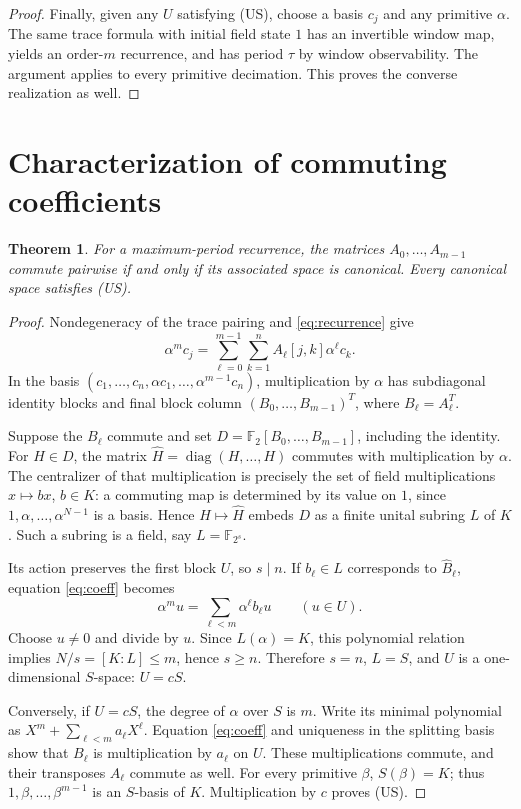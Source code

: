 \documentclass[11pt,a4paper]{article}
\newtheorem{theorem}{Theorem}[section]
\theoremstyle{definition}\newtheorem{definition}[theorem]{Definition}
\theoremstyle{remark}\newtheorem{remark}[theorem]{Remark}
\newcommand{\F}{\mathbb F}
\newcommand{\US}{\textup{(US)}}
\numberwithin{equation}{section}
\begin{document}
\begin{proof}
Finally, given any $U$ satisfying \US, choose a basis $c_j$ and any primitive $\alpha$. The same trace formula with initial field state $1$ has an invertible window map, yields an order-$m$ recurrence, and has period $\tau$ by window observability. The argument applies to every primitive decimation. This proves the converse realization as well.
\end{proof}

\section{Characterization of commuting coefficients}\label{sec:commute}
\begin{theorem}\label{thm:commute}
For a maximum-period recurrence, the matrices $A_0,\ldots,A_{m-1}$ commute pairwise if and only if its associated space is canonical. Every canonical space satisfies \US.
\end{theorem}
\begin{proof}
Nondegeneracy of the trace pairing and \eqref{eq:recurrence} give
\begin{equation}\label{eq:coeff}
\alpha^m c_j=\sum_{\ell=0}^{m-1}\sum_{k=1}^n A_\ell[j,k]\alpha^\ell c_k.
\end{equation}
In the basis $(c_1,\ldots,c_n,\alpha c_1,\ldots,\alpha^{m-1}c_n)$, multiplication by $\alpha$ has subdiagonal identity blocks and final block column $(B_0,\ldots,B_{m-1})^T$, where $B_\ell=A_\ell^T$.

Suppose the $B_\ell$ commute and set $D=\F_2[B_0,\ldots,B_{m-1}]$, including the identity. For $H\in D$, the matrix $\widehat H=\operatorname{diag}(H,\ldots,H)$ commutes with multiplication by $\alpha$. The centralizer of that multiplication is precisely the set of field multiplications $x\mapsto bx$, $b\in K$: a commuting map is determined by its value on $1$, since $1,\alpha,\ldots,\alpha^{N-1}$ is a basis. Hence $H\mapsto\widehat H$ embeds $D$ as a finite unital subring $L$ of $K$. Such a subring is a field, say $L=\F_{2^s}$.

Its action preserves the first block $U$, so $s\mid n$. If $b_\ell\in L$ corresponds to $\widehat B_\ell$, equation \eqref{eq:coeff} becomes
\[
\alpha^m u=\sum_{\ell<m}\alpha^\ell b_\ell u\qquad(u\in U).
\]
Choose $u\ne0$ and divide by $u$. Since $L(\alpha)=K$, this polynomial relation implies $N/s=[K:L]\le m$, hence $s\ge n$. Therefore $s=n$, $L=S$, and $U$ is a one-dimensional $S$-space: $U=cS$.

Conversely, if $U=cS$, the degree of $\alpha$ over $S$ is $m$. Write its minimal polynomial as $X^m+\sum_{\ell<m}a_\ell X^\ell$. Equation \eqref{eq:coeff} and uniqueness in the splitting basis show that $B_\ell$ is multiplication by $a_\ell$ on $U$. These multiplications commute, and their transposes $A_\ell$ commute as well. For every primitive $\beta$, $S(\beta)=K$; thus $1,\beta,\ldots,\beta^{m-1}$ is an $S$-basis of $K$. Multiplication by $c$ proves \US.
\end{proof}
\end{document}
